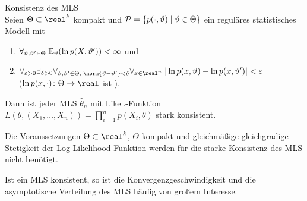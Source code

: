 \begin{Satz}{Konsistenz des MLS}\\
    Seien $\Theta \subset \real^k$ kompakt und $\P = \{p(\cdot, \theta) \;|\; \theta \in \Theta\}$
    ein reguläres statistisches Modell mit
    \begin{enumerate}
        \item
        $\forall_{\theta, \theta' \in \Theta}\; \EE_\theta(\ln p(X, \theta')) < \infty$ und
        
        \item
        $\forall_{\varepsilon > 0} \exists_{\delta > 0} \forall_{\theta, \theta' \in \Theta,\;
        \norm{\theta - \theta'} < \delta} \forall_{x \in \real^n}\;
        |\ln p(x, \theta) - \ln p(x, \theta')| < \varepsilon$\\
        ($\ln p(x, \cdot)\colon \Theta \rightarrow \real$ ist
        ).
    \end{enumerate}
    Dann ist jeder MLS $\widehat{\theta}_n$ mit Likel.-Funktion
    $L(\theta, (X_1, \dotsc, X_n)) = \prod_{i=1}^n p(X_i, \theta)$
    stark konsistent.
\end{Satz}

\begin{Bem}
    Die Voraussetzungen $\Theta \subset \real^k$, $\Theta$ kompakt und
    gleichmäßige gleichgradige Stetigkeit der Log-Likelihood-Funktion werden für die
    starke Konsistenz des MLS nicht benötigt.
\end{Bem}

\linie

\begin{Bem}
    Ist ein MLS konsistent, so ist die Konvergenzgeschwindigkeit und die asymptotische Verteilung
    des MLS häufig von großem Interesse.
\end{Bem}

